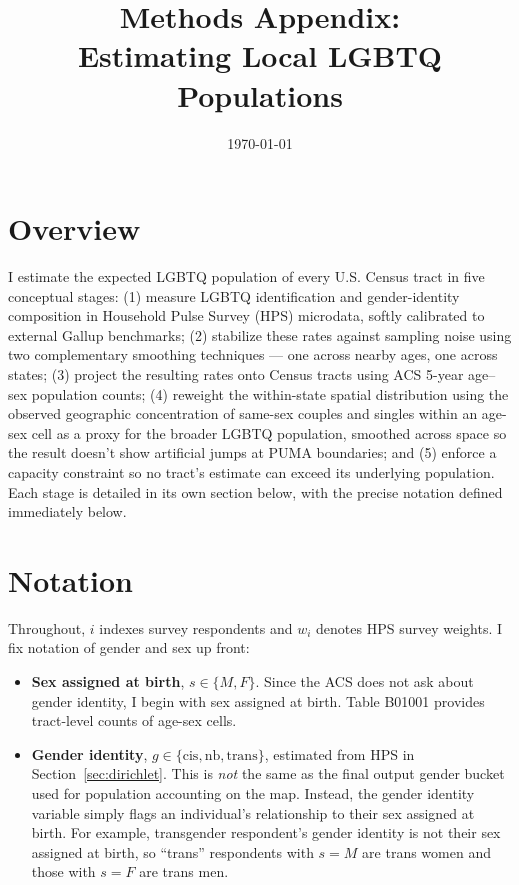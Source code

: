 \documentclass[11pt]{article}
\title{Methods Appendix:\\Estimating Local LGBTQ Populations}
\author{ }
\date{\today}
\begin{document}
\maketitle

\section*{Overview}

I estimate the expected LGBTQ population of every U.S. Census tract in five
conceptual stages: (1) measure LGBTQ identification and gender-identity
composition in Household Pulse Survey (HPS) microdata, softly calibrated to
external Gallup benchmarks; (2) stabilize these rates against sampling noise using two complementary smoothing techniques — one across nearby ages, one across states; (3) project the resulting rates onto Census tracts using ACS 5-year age–sex population counts; (4) reweight the within-state spatial distribution using the observed geographic concentration of same-sex couples and singles within an age-sex cell as a proxy for the broader LGBTQ population, smoothed across space so the result doesn't show artificial jumps at PUMA boundaries; and (5) enforce a capacity constraint so no tract's estimate can exceed its underlying population. Each stage is detailed in its own section below, with the precise notation defined immediately below.

\section*{Notation}

Throughout, $i$ indexes survey respondents and $w_i$ denotes HPS survey
weights. I fix notation of gender and sex up front:

\begin{itemize}
  \item \textbf{Sex assigned at birth}, $s \in \{M, F\}$. Since the ACS does not
  ask about gender identity, I begin with sex assigned at birth.
  Table B01001 provides tract-level counts of age-sex cells.
  \item \textbf{Gender identity}, $g \in \{\text{cis}, \text{nb},
  \text{trans}\}$, estimated from HPS in Section~\ref{sec:dirichlet}. This
  is \emph{not} the same as the final output gender bucket used for
  population accounting on the map. Instead, the gender identity variable
  simply flags an individual's relationship to their sex assigned at birth.
  For example, transgender respondent's gender identity is not their sex
  assigned at birth, so ``trans'' respondents with
  $s=M$ are trans women and those with $s=F$ are trans men.
\end{itemize}
\end{document}
